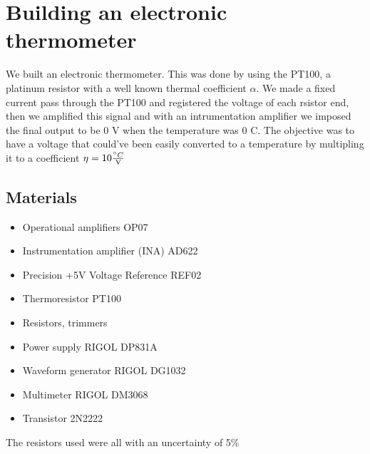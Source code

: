 \chapter{Building an electronic thermometer}
We built an electronic thermometer. This was done by using the PT100, a platinum resistor with a well known thermal coefficient $\alpha$. We made a fixed current pass through the PT100 and registered the voltage of each rsistor end, then we amplified this signal and with an intrumentation amplifier we imposed the final output to be 0 V when the temperature was 0 \degree C. The objective was to have a voltage that could've been easily converted to a temperature by multipling it to a coefficient $\eta = 10 \frac{\degree C}{\text{V}}$


\section{Materials}
\begin{itemize}
\item Operational amplifiers OP07
\item Instrumentation amplifier (INA) AD622
\item Precision +5V Voltage Reference REF02
\item Thermoresistor PT100
\item Resistors, trimmers
\item Power supply RIGOL DP831A
\item Waveform generator RIGOL DG1032
\item Multimeter RIGOL DM3068
\item Transistor 2N2222
\end{itemize}
The resistors used were all with an uncertainty of 5\%
